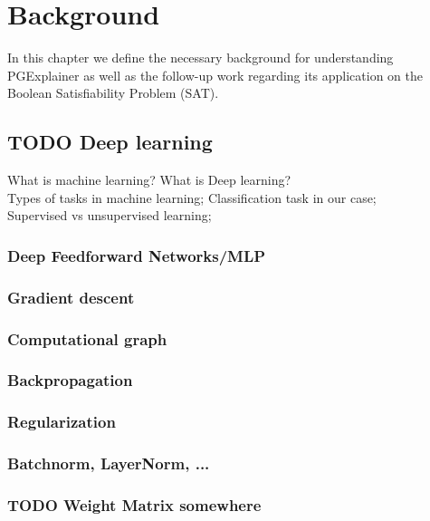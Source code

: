 \chapter{Background}
\label{ch:Background}
In this chapter we define the necessary background for understanding PGExplainer as well as the follow-up work regarding its application on the Boolean Satisfiability Problem (SAT).

\section{TODO Deep learning}
What is machine learning? What is Deep learning? \\
Types of tasks in machine learning; Classification task in our case; \\
Supervised vs unsupervised learning;

\subsection{Deep Feedforward Networks/MLP}

\subsection{Gradient descent}

\subsection{Computational graph}

\subsection{Backpropagation}

\subsection{Regularization}

\subsection{Batchnorm, LayerNorm, ...}

\subsection{TODO Weight Matrix somewhere}

